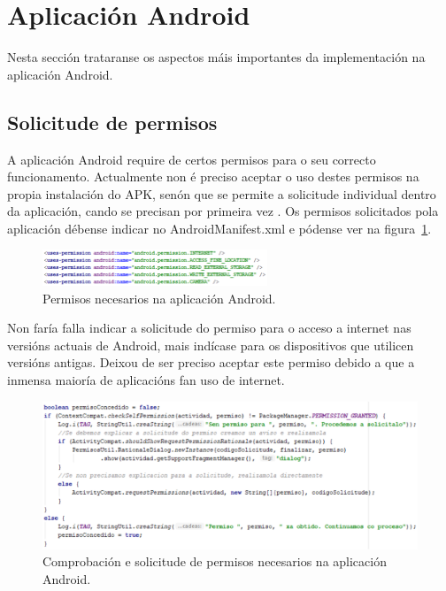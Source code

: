 \section{Aplicación Android}
Nesta sección trataranse os aspectos máis importantes da implementación na aplicación Android.

\subsection{Solicitude de permisos}
A aplicación Android require de certos permisos para o seu correcto funcionamento. Actualmente non é preciso aceptar o uso destes permisos na propia instalación do APK, senón que se permite a solicitude individual dentro da aplicación, cando se precisan por primeira vez \cite{androidSolicitudePermisos}. Os permisos solicitados pola aplicación débense indicar no AndroidManifest.xml e pódense ver na figura~\ref{fig:permisos}.

\begin{figure}[htb] 
	\begin{center}
		\includegraphics[width=0.6\textwidth]{figures/codigo/permisos}
		\caption{Permisos necesarios na aplicación Android.}
		\label{fig:permisos}
	\end{center}
\end{figure}

Non faría falla indicar a solicitude do permiso para o acceso a internet nas versións actuais de Android, mais indícase para os dispositivos que utilicen versións antigas. Deixou de ser preciso aceptar este permiso debido a que a inmensa maioría de aplicacións fan uso de internet.

\begin{figure}[htb] 
	\begin{center}
		\includegraphics[width=1\textwidth]{figures/codigo/solicitudePermisos}
		\caption{Comprobación e solicitude de permisos necesarios na aplicación Android.}
		\label{fig:solicitudePermisos}
	\end{center}
\end{figure}

